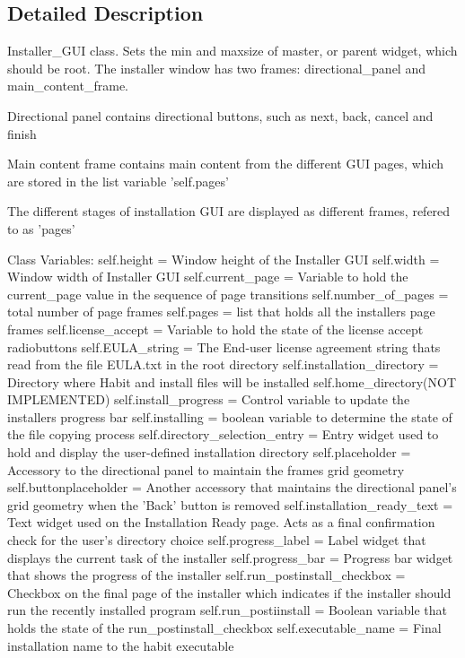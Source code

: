 \subsection{Detailed Description}
\begin{DoxyVerb}Installer_GUI class. Sets the min and maxsize of master, 
or parent widget, which should be root. The installer window 
has two frames: directional_panel and main_content_frame.

Directional panel contains directional buttons, such as
next, back, cancel and finish

Main content frame contains main content from the different
GUI pages, which are stored in the list variable 'self.pages'

The different stages of installation GUI are displayed
as different frames, refered to as 'pages'

Class Variables:
self.height = Window height of the Installer GUI
self.width = Window width of Installer GUI
self.current_page = Variable to hold the current_page value in 
the sequence of page transitions
self.number_of_pages = total number of page frames 
self.pages = list that holds all the installers page frames
self.license_accept = Variable to hold the state of the 
license accept radiobuttons 
self.EULA_string = The End-user license agreement string thats
read from the file EULA.txt in the root directory
self.installation_directory = Directory where Habit and install
files will be installed
self.home_directory(NOT IMPLEMENTED)
self.install_progress = Control variable to update the installers
progress bar
self.installing = boolean variable to determine the state of the 
file copying process
self.directory_selection_entry = Entry widget used to hold and display
the user-defined installation directory
self.placeholder = Accessory to the directional panel to maintain the frames
grid geometry
self.buttonplaceholder = Another accessory that maintains the directional
panel's grid geometry when the 'Back' button is removed
self.installation_ready_text = Text widget used on the Installation Ready
page. Acts as a final confirmation check for the user's directory choice
self.progress_label = Label widget that displays the current task of the 
installer
self.progress_bar = Progress bar widget that shows the progress of the 
installer
self.run_postinstall_checkbox = Checkbox on the final page of the installer
which indicates if the installer should run the recently installed program
self.run_postiinstall = Boolean variable that holds the state of the 
run_postinstall_checkbox
self.executable_name = Final installation name to the habit executable
\end{DoxyVerb}
 

